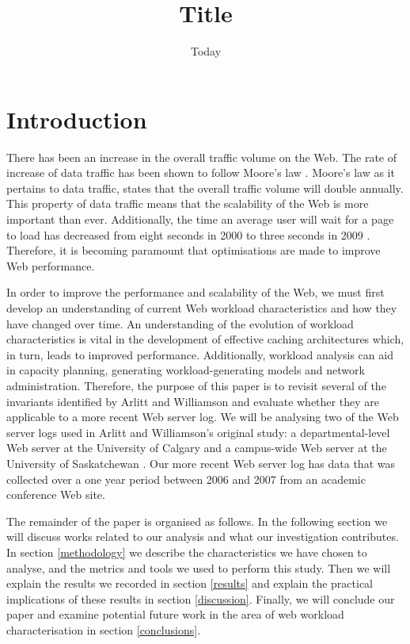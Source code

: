 \documentclass[10pt,conference]{IEEEtran}
\title{Title}
\author{\IEEEauthorblockN{Chelsea Farley, Ryan Lewis, David Armstrong, Rina Gao and Ryunosuke Madenokoji}
\IEEEauthorblockA{The University of Auckland}}
\date{Today}
\begin{document}
\maketitle

\begin{abstract}
\end{abstract}

\section{Introduction}
There has been an increase in the overall traffic volume on the Web. The rate of increase of data traffic has been shown to follow Moore's law \cite{williams05}. Moore's law as it pertains to data traffic, states that the overall traffic volume will double annually. This property of data traffic means that the scalability of the Web is more important than ever. Additionally, the time an average user will wait for a page to load has decreased from eight seconds in 2000 to three seconds in 2009 \cite{Butkiewicz}. Therefore, it is becoming paramount that optimisations are made to improve Web performance.

In order to improve the performance and scalability of the Web, we must first develop an understanding of current Web workload characteristics and how they have changed over time. An understanding of the evolution of workload characteristics is vital in the development of effective caching architectures which, in turn, leads to improved performance. Additionally, workload analysis can aid in capacity planning, generating workload-generating models and network administration. Therefore, the purpose of this paper is to revisit several of the invariants identified by Arlitt and Williamson \cite{keynote} and evaluate whether they are applicable to a more recent Web server log. We will be analysing two of the Web server logs used in Arlitt and Williamson's original study: a departmental-level Web server at the University of Calgary and a campus-wide Web server at the University of Saskatchewan \cite{keynote}. Our more recent Web server log has data that was collected over a one year period between 2006 and 2007 from an academic conference Web site.

The remainder of the paper is organised as follows. In the following section we will discuss works related to our analysis and what our investigation contributes. In section \ref{methodology} we describe the characteristics we have chosen to analyse, and the metrics and tools we used to perform this study. Then we will explain the results we recorded in section \ref{results} and explain the practical implications of these results in section \ref{discussion}. Finally, we will conclude our paper and examine potential future work in the area of web workload characterisation in section \ref{conclusions}.
\end{document}
